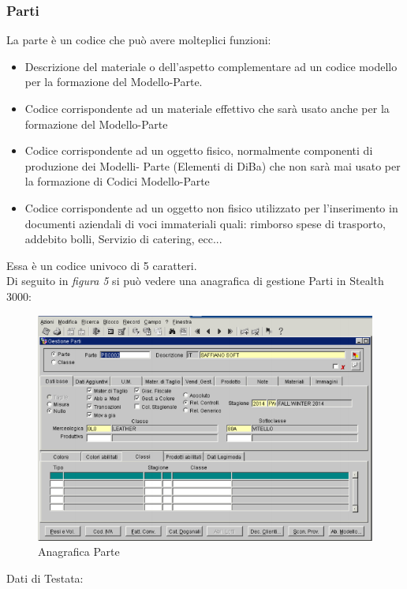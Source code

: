 \subsubsection{Parti}
La parte è un codice che può avere molteplici funzioni:
\begin{itemize}
\item Descrizione del materiale o dell’aspetto complementare ad un codice modello per la formazione del Modello-Parte.

\item Codice corrispondente ad un materiale effettivo che sarà usato anche per la formazione del Modello-Parte

\item Codice corrispondente ad un oggetto fisico, normalmente componenti di produzione dei Modelli- Parte (Elementi di DiBa) che non sarà mai usato per la formazione di Codici Modello-Parte

\item Codice corrispondente ad un oggetto non fisico utilizzato per l’inserimento in documenti aziendali di voci immateriali quali: rimborso spese di trasporto, addebito bolli, Servizio di catering, ecc...
\end{itemize}
Essa è un codice univoco di 5 caratteri.\\
Di seguito in \textit{figura 5} si può vedere una anagrafica di gestione Parti in Stealth 3000:

\begin{figure}[!h]
\thispagestyle{empty}
\centering
\includegraphics[scale=0.90]{img/Parte.png}
\caption{Anagrafica Parte}
\end{figure}
\newpage


Dati di Testata:

